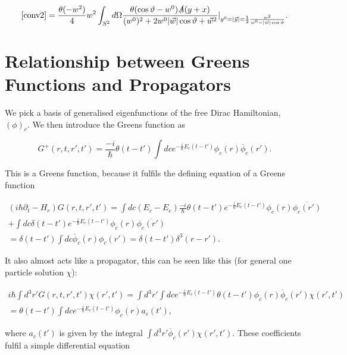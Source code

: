 \documentclass[a4paper,11pt]{article}
\begin{document}
\begin{align}
\eqref{conv2}= \frac{\theta(-w^2)}{4} w^2 \int_{S^2} d \Omega \frac{\theta(\cos\vartheta - w^0) \slashed{A}(y+x)}{(w^0)^2 + 2 w^0 |\vec{w}| \cos\vartheta + \vec{w}^2}|_{y^0=|\vec{y}|=\frac{1}{2}\frac{w^2}{w^0-|\vec{w}|\cos\vartheta}}.
\end{align}



\appendix
\section{Relationship between Greens Functions and Propagators}\label{AppendixPropagatorGreens}

We pick a basis of generalised eigenfunctions of the free Dirac Hamiltonian, \((\phi)_c\). We then introduce the Greens function as

\begin{equation}
G^+(r,t,r',t')=\frac{-i}{\hbar} \theta(t-t') \int dc e^{-\frac{i}{\hbar} E_c(t-t')} \phi_c (r)\overline{\phi}_c(r') .
\end{equation}

This is a Greens function, because it fulfils the defining equation of a Greens function

\begin{align}
(i\hbar \partial_t -H_r) G(r,t,r',t')=\int dc  (E_c-E_c)\frac{-i}{\hbar} \theta(t-t')  e^{-\frac{i}{\hbar} E_c(t-t')} \phi_c(r)  \overline{\phi_c(r')} \\
+ \int dc \delta(t-t') e^{-\frac{i}{\hbar} E_c(t-t')} \phi_c(r) \overline{\phi_c(r')} \\
= \delta(t-t') \int dc \overline{\phi}_c (r) \phi_c (r')=\delta(t-t') \delta^3(r-r').
\end{align}

It also almost acts like a propagator, this can be seen like this (for general one particle solution \(\chi\)):

\begin{align}
i\hbar \int d^3 r' G(r,t,r',t') \chi(r',t') 
= \int d^3 r' \int dc e^{-\frac{i}{\hbar} E_c (t-t')} \theta (t-t') \phi_c (r) \overline{\phi}_c(r') \chi (r',t')\\
=\theta(t-t') \int dc e^{-\frac{i}{\hbar} E_c(t-t')} \phi_c(r) a_c (t'),\label{Greensfunction propagation}
\end{align}

where \(a_c(t')\) is given by the integral \(\int d^3 r' \overline{\phi}_c(r') \chi(r',t')\). These coefficients fulfil a simple differential equation
\end{document}
